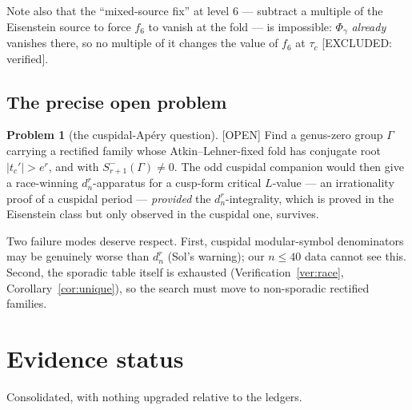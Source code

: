 \documentclass[11pt,reqno]{amsart}
\theoremstyle{plain}
\theoremstyle{definition}
\newtheorem{problem}[theorem]{Problem}
\theoremstyle{remark}
\newcommand{\ExcludedR}[1]{\textup{\textsf{[EXCLUDED: #1]}}}
\newcommand{\Open}{\textup{\textsf{[OPEN]}}}
\begin{document}
Note also that the ``mixed-source fix'' at level $6$ --- subtract a
multiple of the Eisenstein source to force $f_6$ to vanish at the fold ---
is impossible: $\Phi_\gamma$ \emph{already} vanishes there, so no multiple
of it changes the value of $f_6$ at $\tau_c$ \ExcludedR{verified}.

\subsection{The precise open problem}
\begin{problem}[the cuspidal-Ap\'ery question]\label{prob:cusp}
\Open{} Find a genus-zero group $\Gamma$ carrying a rectified family whose
Atkin--Lehner-fixed fold has conjugate root $|t_c'|>e^{r}$, and with
$S^-_{r+1}(\Gamma)\ne0$. The odd cuspidal companion would then give a
race-winning $d_n^r$-apparatus for a cusp-form critical $L$-value --- an
irrationality proof of a cuspidal period --- \emph{provided} the
$d_n^r$-integrality, which is proved in the Eisenstein class but only
observed in the cuspidal one, survives.
\end{problem}

Two failure modes deserve respect. First, cuspidal modular-symbol
denominators may be genuinely worse than $d_n^r$ (Sol's warning); our
$n\le40$ data cannot see this. Second, the sporadic table itself is
exhausted (Verification~\ref{ver:race}, Corollary~\ref{cor:unique}), so the
search must move to non-sporadic rectified families.

\section{Evidence status}\label{sec:status}

Consolidated, with nothing upgraded relative to the ledgers.
\end{document}

